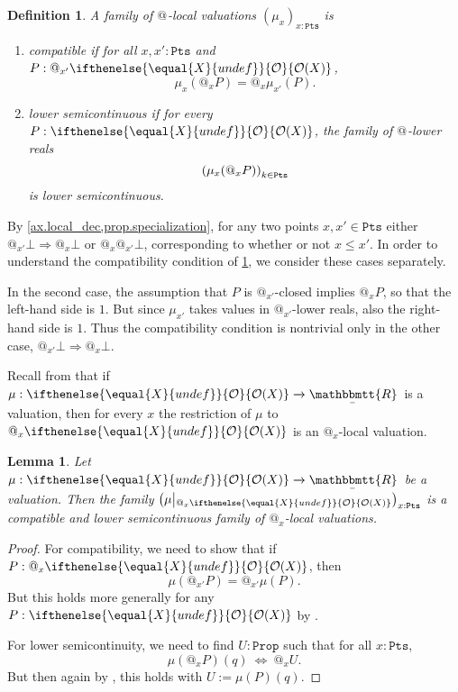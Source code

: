 \documentclass[reqno,11pt]{amsproc}
\makeatletter
\theoremstyle{plain}
\newtheorem{lemma}[theorem]{Lemma}
\newtheorem{definition}[theorem]{Definition}
\theoremstyle{definition}
\newcommand{\Const}[1]{\mathtt{#1}}
\renewcommand{\to}[1][]{\xrightarrow{#1}}
\newcommand{\ubar}[1]{\underaccent{\bar}{#1}}
\newcommand{\internal}[1]{\raisebox{-.03ex}{$\mathbbmtt{#1}$}}
\newcommand{\hs}{\hspace{1pt}}
\newcommand{\trr}{\internal{R}}
\newcommand{\tlrr}{\ubar{\trr}\hs}
\newcommand{\prop}{\Const{Prop}}
\newcommand{\pt}{x}
\newcommand{\Op}[1][undef]{\ifthenelse{\equal{#1}{undef}}{\mathcal{O}}{\mathcal{O}(#1)}}
\newcommand{\pts}{\mathtt{Pts}}		%
\newcommand{\rest}[2]{#1\big|\hspace{0in}_{#2}}
\newcommand{\atsymbol}{{@}}
\newcommand{\at}[1][\pt]{\atsymbol_{#1}}
\newcommand{\imp}{\Rightarrow}
\let\originalleft\left
\let\originalright\right
\renewcommand{\left}{\mathopen{}\mathclose\bgroup\originalleft}
\renewcommand{\right}{\aftergroup\egroup\originalright}
\numberwithin{equation}{section}
\makeatother
\begin{document}
\begin{definition}\label{def.valuations_compatible_lowersemi}
	A family of $\at[]$-local valuations $(\mu_\pt)_{\pt : \pts}$ is
	\begin{enumerate}
		\item \emph{compatible} if for all $\pt, \pt' : \pts$ and $P : \at[\pt'] \Op[X]$,
			\[
				\mu_{\pt}(\at[\pt] P) = \at[\pt] \mu_{\pt'}(P).
			\]
		\item \emph{lower semicontinuous} if for every $P : \Op[X]$, the family of $\at[]$-lower reals
			\[
				\left( \mu_\pt(\at P) \right)_{k\in\pts}
			\]
			is lower semicontinuous.
	\end{enumerate}
\end{definition}

By \cref{ax.local_dec,prop.specialization}, for any two points $\pt,\pt'\in\pts$ either $\at[\pt']\bot\imp\at[\pt]\bot$ or $\at[\pt]\at[\pt']\bot$, corresponding to whether or not $\pt\le\pt'$. In order to understand the compatibility condition of \cref{def.valuations_compatible_lowersemi}, we consider these cases separately. 

In the second case, the assumption that $P$ is $\at[\pt']$-closed implies $\at[\pt] P$, so that the left-hand side is $1$. But since $\mu_{\pt'}$ takes values in $\at[\pt']$-lower reals, also the right-hand side is $1$. Thus the compatibility condition is nontrivial only in the other case, $\at[\pt'] \bot \imp \at[\pt] \bot$.

Recall from  that if $\mu : \Op[X] \to \tlrr$ is a valuation, then for every $\pt$ the restriction of $\mu$ to $\at \Op[X]$ is an $\at$-local valuation. 

\begin{lemma}\label{lemma.val_rests_compat_lowersemi}
	Let $\mu : \Op[X] \to \tlrr$ be a valuation. Then the family $\left( \rest{\mu}{\at \Op[X]} \right)_{\pt : \pts}$ is a compatible and lower semicontinuous family of $\at$-local valuations.
\end{lemma}

\begin{proof}
	For compatibility, we need to show that if $P : \at \Op[X]$, then
	\[
		\mu( \at[\pt'] P ) = \at[\pt'] \mu(P).
	\]
	But this holds more generally for any $P:\Op[X]$ by .

	For lower semicontinuity, we need to find $U : \prop$ such that for all $\pt : \pts$,
	\[
		\mu(\at P)(q) \: \Leftrightarrow \: \at U.
	\]
	But then again by , this holds with $U := \mu(P)(q)$.
\end{proof}
\end{document}

